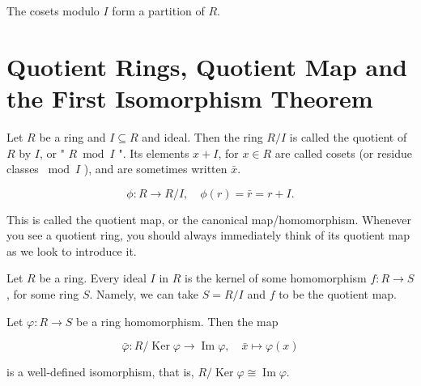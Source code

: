 \begin{lemma}
  The cosets modulo \(I\) form a partition of \(R\).
\end{lemma}

\begin{proofidea}
  
  
\end{proofidea}
  
\begin{formalproof}
  
\end{formalproof}

\section{Quotient Rings, Quotient Map and the First Isomorphism Theorem}

\begin{definition}
Let \(R\) be a ring and \(I \subseteq R\) and ideal. Then the ring \(R / I\) is called the quotient of \(R\) by \(I\), or " \(R \bmod I\) ". Its elements \(x+I\), for \(x \in R\) are called cosets (or residue classes \(\bmod I\) ), and are sometimes written \(\bar{x}\).
\end{definition}

\begin{definition}
  \[
\phi : R \longrightarrow R / I, \quad \phi(r) = \bar{r}=r+I .
\]

This is called the quotient map, or the canonical map/homomorphism. Whenever you see a quotient ring, you should always immediately think of its quotient map as we look to introduce it.
\end{definition}

\begin{proposition}
Let \(R\) be a ring. Every ideal \(I\) in \(R\) is the kernel of some homomorphism \(f: R \rightarrow S\), for some ring \(S\). Namely, we can take \(S=R / I\) and \(f\) to be the quotient map.
\end{proposition}

\begin{theorem}
  Let \(\varphi: R \rightarrow S\) be a ring homomorphism. Then the map

\[
\bar{\varphi}: R / \operatorname{Ker} \varphi \longrightarrow \operatorname{Im} \varphi, \quad \bar{x} \longmapsto \varphi(x)
\]

is a well-defined isomorphism, that is, \(R / \operatorname{Ker} \varphi \cong \operatorname{Im} \varphi\).
\end{theorem}


